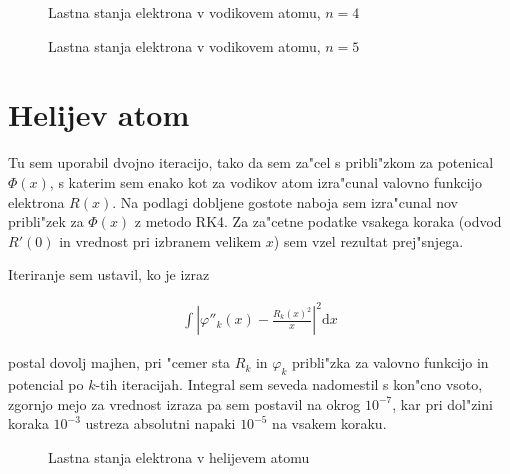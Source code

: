 \documentclass[a4paper,10pt]{article}
\newcommand{\dd}{\mathrm{d}}
\begin{document}
\begin{figure}[h]
 
 \caption{Lastna stanja elektrona v vodikovem atomu, $n = 4$}
 \label{fig:vodik-4}
\end{figure}

\begin{figure}[h]
 
 \caption{Lastna stanja elektrona v vodikovem atomu, $n = 5$}
 \label{fig:vodik-5}
\end{figure}



\section{Helijev atom}

Tu sem uporabil dvojno iteracijo, tako da sem za"cel s pribli"zkom za potenical $\Phi(x)$, s katerim sem enako kot za vodikov atom izra"cunal valovno funkcijo elektrona $R(x)$. Na podlagi dobljene gostote naboja sem izra"cunal nov pribli"zek za $\Phi(x)$ z metodo RK4. Za za"cetne podatke vsakega koraka (odvod $R'(0)$ in vrednost pri izbranem velikem $x$) sem vzel rezultat prej"snjega. 

Iteriranje sem ustavil, ko je izraz

\begin{align}
 \int \left|\varphi''_k(x) - \frac{R_k(x)^2}{x}\right|^2 \dd x
\end{align}

postal dovolj majhen, pri "cemer sta $R_k$ in $\varphi_k$ pribli"zka za valovno funkcijo in potencial po $k$-tih iteracijah. Integral sem seveda nadomestil s kon"cno vsoto, zgornjo mejo za vrednost izraza pa sem postavil na okrog $10^{-7}$, kar pri dol"zini koraka $10^{-3}$ ustreza absolutni napaki $10^{-5}$ na vsakem koraku. 


\begin{figure}[h]
 
 \caption{Lastna stanja elektrona v helijevem atomu}
 \label{fig:helij}
\end{figure}
\end{document}
